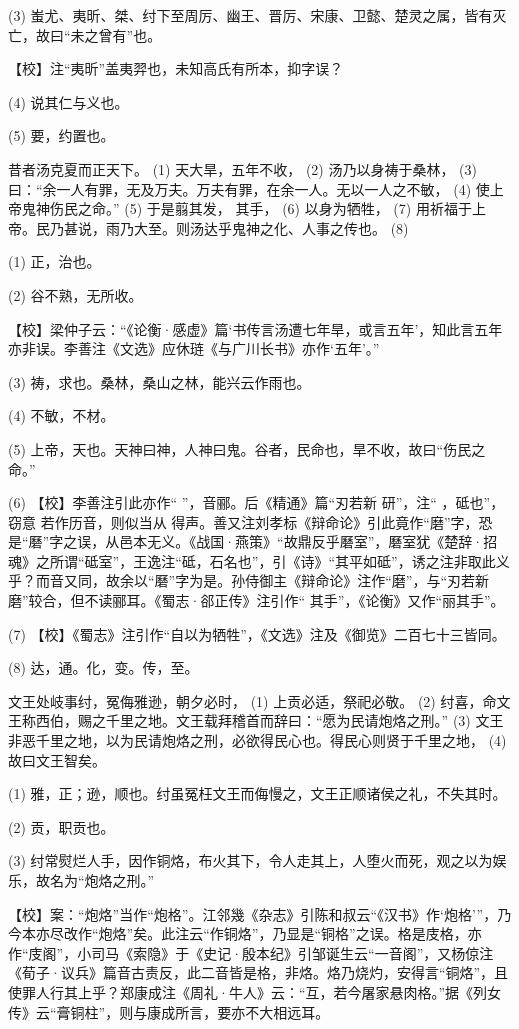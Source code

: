 \documentclass[12pt,UTF8]{ctexbook}
\begin{document}
(3) 蚩尤、夷昕、桀、纣下至周厉、幽王、晋厉、宋康、卫懿、楚灵之属，皆有灭亡，故曰“未之曾有”也。

【校】注“夷昕”盖夷羿也，未知高氏有所本，抑字误？

(4) 说其仁与义也。

(5) 要，约置也。

昔者汤克夏而正天下。 (1) 天大旱，五年不收， (2) 汤乃以身祷于桑林， (3) 曰：“余一人有罪，无及万夫。万夫有罪，在余一人。无以一人之不敏， (4) 使上帝鬼神伤民之命。” (5) 于是翦其发， 其手， (6) 以身为牺牲， (7) 用祈福于上帝。民乃甚说，雨乃大至。则汤达乎鬼神之化、人事之传也。 (8)

(1) 正，治也。

(2) 谷不熟，无所收。

【校】梁仲子云：“《论衡·感虚》篇‘书传言汤遭七年旱，或言五年’，知此言五年亦非误。李善注《文选》应休琏《与广川长书》亦作‘五年’。”

(3) 祷，求也。桑林，桑山之林，能兴云作雨也。

(4) 不敏，不材。

(5) 上帝，天也。天神曰神，人神曰鬼。谷者，民命也，旱不收，故曰“伤民之命。”

(6) 【校】李善注引此亦作“ ”，音郦。后《精通》篇“刃若新 研”，注“ ，砥也”，窃意 若作历音，则似当从 得声。善又注刘孝标《辩命论》引此竟作“磨”字，恐是“磿”字之误，从邑本无义。《战国·燕策》“故鼎反乎磿室”，磿室犹《楚辞·招魂》之所谓“砥室”，王逸注“砥，石名也”，引《诗》“其平如砥”，诱之注非取此义乎？而音又同，故余以“磿”字为是。孙侍御主《辩命论》注作“磨”，与“刃若新磨”较合，但不读郦耳。《蜀志·郤正传》注引作“ 其手”，《论衡》又作“丽其手”。

(7) 【校】《蜀志》注引作“自以为牺牲”，《文选》注及《御览》二百七十三皆同。

(8) 达，通。化，变。传，至。

文王处岐事纣，冤侮雅逊，朝夕必时， (1) 上贡必适，祭祀必敬。 (2) 纣喜，命文王称西伯，赐之千里之地。文王载拜稽首而辞曰：“愿为民请炮烙之刑。” (3) 文王非恶千里之地，以为民请炮烙之刑，必欲得民心也。得民心则贤于千里之地， (4) 故曰文王智矣。

(1) 雅，正；逊，顺也。纣虽冤枉文王而侮慢之，文王正顺诸侯之礼，不失其时。

(2) 贡，职贡也。

(3) 纣常熨烂人手，因作铜烙，布火其下，令人走其上，人堕火而死，观之以为娱乐，故名为“炮烙之刑。”

【校】案：“炮烙”当作“炮格”。江邻幾《杂志》引陈和叔云“《汉书》作‘炮格’”，乃今本亦尽改作“炮烙”矣。此注云“作铜烙”，乃显是“铜格”之误。格是庋格，亦作“庋阁”，小司马《索隐》于《史记·殷本纪》引邹诞生云“一音阁”，又杨倞注《荀子·议兵》篇音古责反，此二音皆是格，非烙。烙乃烧灼，安得言“铜烙”，且使罪人行其上乎？郑康成注《周礼·牛人》云：“互，若今屠家悬肉格。”据《列女传》云“膏铜柱”，则与康成所言，要亦不大相远耳。
\end{document}
